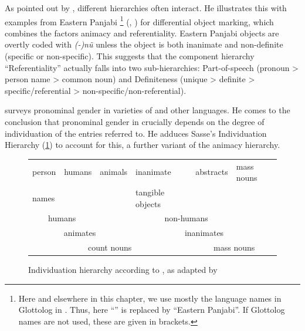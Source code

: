 \documentclass[output=collectionpaper]{langsci/langscibook}
\begin{document}
%

\sloppy
As pointed out by \cite[166]{Croft2003}, different hierarchies often interact. He illustrates this with examples from Eastern Panjabi%
\footnote{%
Here and elsewhere in this chapter, we use mostly the language names in Glottolog in \cite{Hammarstroem2018}. Thus, here ``'' is replaced by ``Eastern Panjabi''. If Glottolog names are not used, these are given in brackets.
} %
(, ) for differential object marking, which combines the factors animacy and referentiality. Eastern Panjabi objects are overtly coded with \textit{(-)nũ} unless the object is both inanimate and non-definite (specific or non-specific). This suggests that the component hierarchy ``Referentiality'' actually falls into two  sub-hierarchies:
Part-of-speech
(pronoun > person name > common noun) 
and Definiteness
(unique > definite > specific/referential > non-specific/non-referential).


\cite{Siemund2008} surveys pronominal gender in varieties of  and other languages. He comes to the conclusion that pronominal gender in  crucially depends on the degree of individuation of the entries referred to. He adduces Sasse's Individuation Hierarchy (\ref{fig:WDG:1}) to account for this, a further variant of the animacy hierarchy.

\begin{figure}[htb]
\begin{tabular}{|l|l|l|l|l|l|}
\hline person &	humans &	animals &	inanimate  &	abstracts	& mass nouns \\
names & & & tangible objects & & \\
\hline \multicolumn{2}{|c|}{humans} &	\multicolumn{4}{c|}{non-humans} \\
\hline \multicolumn{3}{|c|}{animates} &	\multicolumn{3}{c|}{inanimates} \\
\hline \multicolumn{4}{|c|}{count nouns} &	\multicolumn{2}{c|}{mass nouns} \\
\hline
\end{tabular}
\caption{Individuation hierarchy according to \cite[659]{Sasse1993}, as adapted by \citet[90]{Karatsareas2014}}
\label{fig:WDG:1}
\end{figure}
\end{document}
